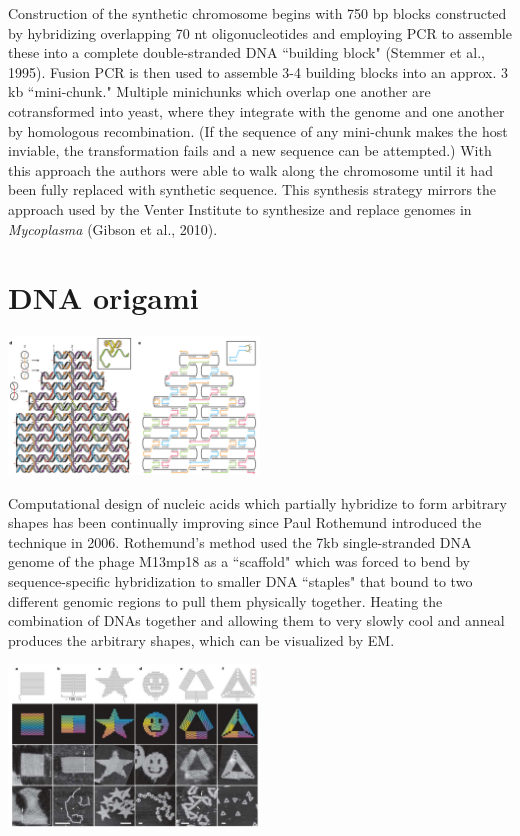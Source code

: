 \documentclass{article}
\begin{document}
Construction of the synthetic chromosome begins with 750 bp blocks constructed by hybridizing overlapping 70 nt oligonucleotides and employing PCR to assemble these into a complete double-stranded DNA ``building block" (Stemmer et al., 1995). Fusion PCR is then used to assemble 3-4 building blocks into an approx. 3 kb ``mini-chunk." Multiple minichunks which overlap one another are cotransformed into yeast, where they integrate with the genome and one another by homologous recombination. (If the sequence of any mini-chunk makes the host inviable, the transformation fails and a new sequence can be attempted.) With this approach the authors were able to walk along the chromosome until it had been fully replaced with synthetic sequence. This synthesis strategy mirrors the approach used by the Venter Institute to synthesize and replace genomes in \textit{Mycoplasma} (Gibson et al., 2010).

\section*{DNA origami}

\begin{center}
\includegraphics[width=0.5\textwidth]{rothemund1.pdf}
\end{center}

Computational design of nucleic acids which partially hybridize to form arbitrary shapes has been continually improving since Paul Rothemund introduced the technique in 2006. Rothemund's method used the 7kb single-stranded DNA genome of the phage M13mp18 as a ``scaffold" which was forced to bend by sequence-specific hybridization to smaller DNA ``staples" that bound to two different genomic regions to pull them physically together. Heating the combination of DNAs together and allowing them to very slowly cool and anneal produces the arbitrary shapes, which can be visualized by EM.

\begin{center}
\includegraphics[width=0.5\textwidth]{rothemund2.pdf}
\end{center}
\end{document}
